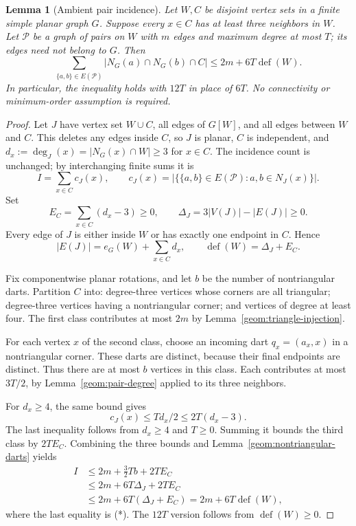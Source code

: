 \documentclass[11pt,a4paper]{article}
\newtheorem{lemma}[lemma]{Lemma}
\theoremstyle{definition}
\theoremstyle{remark}
\DeclareMathOperator{\Def}{def}
\begin{document}
\begin{lemma}[Ambient pair incidence]\label{geom:ambient-pairs}
Let $W,C$ be disjoint vertex sets in a finite simple planar graph $G$.
Suppose every $x\in C$ has at least three neighbors in $W$.
Let $\mathcal P$ be a graph of pairs on $W$ with $m$ edges and maximum
degree at most $T$; its edges need not belong to $G$. Then
\begin{equation}\label{geom:ambient-strong}
 \sum_{\{a,b\}\in E(\mathcal P)}|N_G(a)\cap N_G(b)\cap C|
 \leq2m+6T\Def(W).
\end{equation}
In particular, the inequality holds with $12T$ in place of $6T$.
No connectivity or minimum-order assumption is required.
\end{lemma}
\begin{proof}
Let $J$ have vertex set $W\cup C$, all edges of $G[W]$, and all edges
between $W$ and $C$. This deletes any edges inside $C$, so $J$ is
planar, $C$ is independent, and
$d_x:=\deg_J(x)=|N_G(x)\cap W|\geq3$ for $x\in C$.
The incidence count is unchanged; by interchanging finite sums it is
\[
 I=\sum_{x\in C}c_J(x),\qquad
 c_J(x)=|\{\{a,b\}\in E(\mathcal P):a,b\in N_J(x)\}|.
\]
Set
\[
 E_C=\sum_{x\in C}(d_x-3)\geq0,\qquad
 \Delta_J=3|V(J)|-|E(J)|\geq0.
\]
Every edge of $J$ is either inside $W$ or has exactly one endpoint in
$C$. Hence
\[
 |E(J)|=e_G(W)+\sum_{x\in C}d_x,
 \qquad
 \Def(W)=\Delta_J+E_C.                         \tag{*}
\]

Fix componentwise planar rotations, and let $b$ be the number of
nontriangular darts. Partition $C$ into: degree-three vertices whose
corners are all triangular; degree-three vertices having a nontriangular
corner; and vertices of degree at least four. The first class contributes
at most $2m$ by Lemma~\ref{geom:triangle-injection}.

For each vertex $x$ of the second class, choose an incoming dart
$q_x=(a_x,x)$ in a nontriangular corner. These darts are distinct,
because their final endpoints are distinct. Thus there are at most $b$
vertices in this class. Each contributes at most $3T/2$, by
Lemma~\ref{geom:pair-degree} applied to its three neighbors.

For $d_x\geq4$, the same bound gives
\[
 c_J(x)\leq Td_x/2\leq2T(d_x-3).
\]
The last inequality follows from $d_x\geq4$ and $T\geq0$. Summing it
bounds the third class by $2TE_C$. Combining the three bounds and
Lemma~\ref{geom:nontriangular-darts} yields
\[
 \begin{split}
 I&\leq2m+\tfrac32Tb+2TE_C\\
  &\leq2m+6T\Delta_J+2TE_C\\
  &\leq2m+6T(\Delta_J+E_C)=2m+6T\Def(W),
 \end{split}
\]
where the last equality is (*). The $12T$ version follows from
$\Def(W)\geq0$.
\end{proof}
\end{document}
